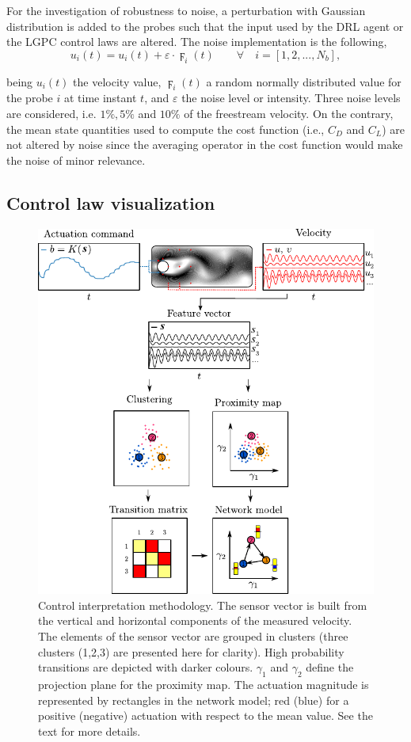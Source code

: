 For the investigation of robustness to noise, a perturbation with Gaussian distribution is added to the probes such that the input used by the DRL agent or the LGPC control laws are altered. The noise implementation is the following,
\begin{equation}
    u_i(t) = u_i(t) + \varepsilon \cdot \digamma_i(t) \qquad \forall \quad i = [1,2, ... , N_b],
\end{equation}

being $u_i(t)$ the velocity value, $\digamma_i(t)$ a random normally distributed value for the probe $i$ at time instant $t$, and $\varepsilon$ the noise level or intensity. Three noise levels are considered, i.e. $1\%,5\%$ and $10\%$ of the freestream velocity. On the contrary, the mean state quantities used to compute the cost function (i.e., $C_D$ and $C_L$) are not altered by noise since the averaging operator in the cost function would make the noise of minor relevance. 

\subsection{Control law visualization}\label{Sec:Method_ControlLawVisu}
%
\begin{figure}
    \centering
    \includegraphics[width=0.75\linewidth]{Figures/3.pdf}
    \caption{Control interpretation methodology. The sensor vector is built from the vertical and horizontal components of the measured velocity. The elements of the sensor vector are grouped in clusters (three clusters (1,2,3) are presented here for clarity). High probability transitions are depicted with darker colours. $\gamma_1$ and $\gamma_2$ define the projection plane for the proximity map. The actuation magnitude is represented by rectangles in the network model; red (blue) for a positive (negative) actuation with respect to the mean value. See the text for more details.}
    \label{fig:ApproxMethod}
\end{figure}


